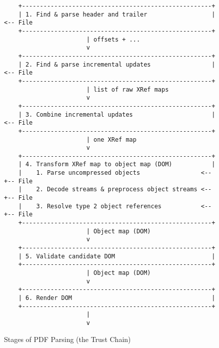\begin{figure}[t]
  \centering
  \begin{lstlisting}
    +-----------------------------------------------------+
    | 1. Find & parse header and trailer                  |<-- File
    +-----------------------------------------------------+
                       | offsets + ...
                       v
    +-----------------------------------------------------+
    | 2. Find & parse incremental updates                 |<-- File
    +-----------------------------------------------------+
                       | list of raw XRef maps
                       v
    +-----------------------------------------------------+
    | 3. Combine incremental updates                      |<-- File
    +-----------------------------------------------------+
                       | one XRef map
                       v
    +-----------------------------------------------------+
    | 4. Transform XRef map to object map (DOM)           |
    |    1. Parse uncompressed objects                 <--+-- File
    |    2. Decode streams & preprocess object streams <--+-- File
    |    3. Resolve type 2 object references           <--+-- File
    +-----------------------------------------------------+
                       | Object map (DOM)
                       v
    +-----------------------------------------------------+
    | 5. Validate candidate DOM                           |
    +-----------------------------------------------------+
                       | Object map (DOM)                                    
                       v
    +-----------------------------------------------------+
    | 6. Render DOM                                       |
    +-----------------------------------------------------+
                       | 
                       v
  \end{lstlisting}
  \caption{Stages of PDF Parsing (the Trust Chain)}
  \label{fig:pdf-trust-chain}
\end{figure}

